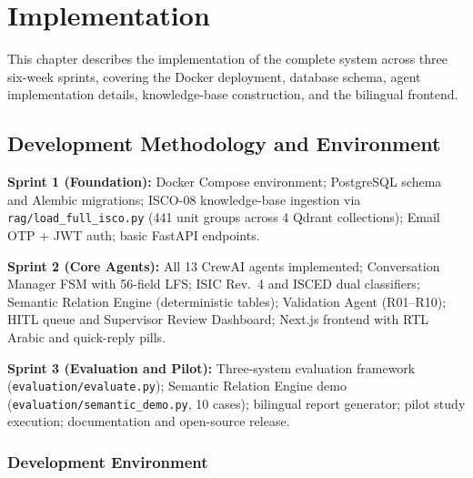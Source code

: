 \chapter{Implementation}
\label{chap:implementation}

This chapter describes the implementation of the complete system across three
six-week sprints, covering the Docker deployment, database schema, agent
implementation details, knowledge-base construction, and the bilingual frontend.

\section{Development Methodology and Environment}
\label{sec:impl-method}

\textbf{Sprint 1 (Foundation):} Docker Compose environment; PostgreSQL schema
and Alembic migrations; ISCO-08 knowledge-base ingestion via
\texttt{rag/load\_full\_isco.py} (441 unit groups across 4 Qdrant collections);
Email OTP + JWT auth; basic FastAPI endpoints.

\textbf{Sprint 2 (Core Agents):} All 13 CrewAI agents implemented;
Conversation Manager FSM with 56-field LFS; ISIC Rev.~4 and ISCED dual
classifiers; Semantic Relation Engine (deterministic tables); Validation Agent
(R01--R10); HITL queue and Supervisor Review Dashboard; Next.js frontend with
RTL Arabic and quick-reply pills.

\textbf{Sprint 3 (Evaluation and Pilot):} Three-system evaluation framework
(\texttt{evaluation/evaluate.py}); Semantic Relation Engine demo
(\texttt{evaluation/\-semantic\_\-demo.\-py}, 10 cases); bilingual report generator;
pilot study execution; documentation and open-source release.

\subsection{Development Environment}

